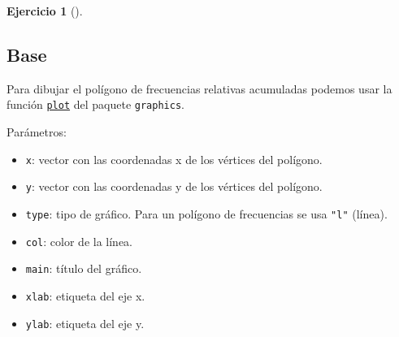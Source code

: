\documentclass[
  spanish,
  a4paper,
]{scrreport}
\providecommand{\tightlist}{%
  \setlength{\itemsep}{0pt}\setlength{\parskip}{0pt}}
\theoremstyle{definition}
\newtheorem{exercise}{Ejercicio}[chapter]
\theoremstyle{remark}
\begin{document}
\begin{exercise}[]
\begin{enumerate}
  \begin{tcolorbox}[enhanced jigsaw, breakable, leftrule=.75mm, toptitle=1mm, rightrule=.15mm, opacitybacktitle=0.6, left=2mm, colframe=quarto-callout-tip-color-frame, titlerule=0mm, toprule=.15mm, opacityback=0, bottomtitle=1mm, coltitle=black, colbacktitle=quarto-callout-tip-color!10!white, title=\textcolor{quarto-callout-tip-color}{\faLightbulb}\hspace{0.5em}{Solución}, arc=.35mm, bottomrule=.15mm, colback=white]

  \section{Base}

  Para dibujar el polígono de frecuencias relativas acumuladas podemos
  usar la función
  \href{https://www.rdocumentation.org/packages/graphics/versions/3.6.2/topics/plot}{\texttt{plot}}
  del paquete \texttt{graphics}.

  Parámetros:

  \begin{itemize}
  \tightlist
  \item
    \texttt{x}: vector con las coordenadas x de los vértices del
    polígono.
  \item
    \texttt{y}: vector con las coordenadas y de los vértices del
    polígono.
  \item
    \texttt{type}: tipo de gráfico. Para un polígono de frecuencias se
    usa \texttt{"l"} (línea).
  \item
    \texttt{col}: color de la línea.
  \item
    \texttt{main}: título del gráfico.
  \item
    \texttt{xlab}: etiqueta del eje x.
  \item
    \texttt{ylab}: etiqueta del eje y.
  \end{itemize}


\end{tcolorbox}
\end{enumerate}
\end{exercise}
\end{document}
